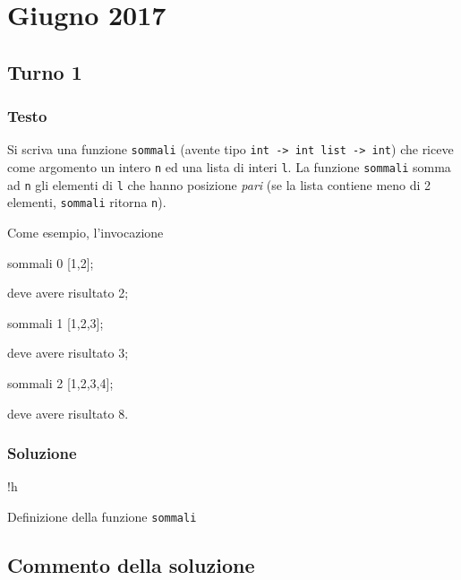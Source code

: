 \section{Giugno 2017}

\subsection{Turno 1}

\subsubsection{Testo}

Si scriva una funzione \texttt{sommali} (avente tipo \texttt{int -> int list -> int}) che riceve come argomento un intero \texttt{n} ed una lista di interi \texttt{l}.
La funzione \texttt{sommali} somma ad \texttt{n} gli elementi di \texttt{l} che hanno posizione \emph{pari} (se la lista contiene meno di 2 elementi, \texttt{sommali} ritorna \texttt{n}).

\medskip
Come esempio, l'invocazione

\begin{smlcode}
sommali 0 [1,2];
\end{smlcode}

deve avere risultato 2;

\begin{smlcode}
sommali 1 [1,2,3];
\end{smlcode}

deve avere risultato 3;

\begin{smlcode}
sommali 2 [1,2,3,4];
\end{smlcode}

deve avere risultato 8.

\subsubsection{Soluzione}


\begin{listing}{!h}
\caption[funzione \texttt{sommali} -- Turno 1]{Definizione della funzione \texttt{sommali}}
\end{listing}

\subsection{Commento della soluzione}

